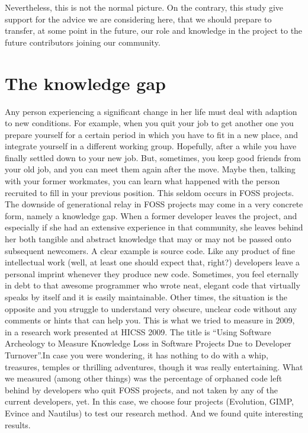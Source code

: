 Nevertheless, this is not the normal picture. On the contrary, this study give support for the advice we are considering here, that we should prepare to transfer, at some point in the future, our role and knowledge in the project to the future contributors joining our community.

\section*{The knowledge gap}

Any person experiencing a significant change in her life must deal with adaption to new conditions. For example, when you quit your job to get another one you prepare yourself for a certain period in which you have to fit in a new place, and integrate yourself in a different working group. Hopefully, after a while you have finally settled down to your new job. But, sometimes, you keep good friends from your old job, and you can meet them again after the move. Maybe then, talking with your former workmates, you can learn what happened with the person recruited to fill in your previous position. This seldom occurs in FOSS projects.
The downside of generational relay in FOSS projects may come in a very concrete form, namely a knowledge gap. When a former developer leaves the project, and especially if she had an extensive experience in that community, she leaves behind her both tangible and abstract knowledge that may or may not be passed onto subsequent newcomers.
A clear example is source code. Like any product of fine intellectual work (well, at least one should expect that, right?) developers leave a personal imprint whenever they produce new code. Sometimes, you feel eternally in debt to that awesome programmer who wrote neat, elegant code that virtually speaks by itself and it is easily maintainable. Other times, the situation is the opposite and you struggle to understand very obscure, unclear code without any comments or hints that can help you.
This is what we tried to measure in 2009, in a research work presented at HICSS 2009. The title is “Using Software Archeology to Measure Knowledge Loss in Software Projects Due to Developer Turnover”.In case you were wondering, it has nothing to do with a whip, treasures, temples or thrilling adventures, though it was really entertaining. What we measured (among other things) was the percentage of orphaned code left behind by developers who quit FOSS projects, and not taken by any of the current developers, yet. In this case, we choose four projects (Evolution, GIMP, Evince and Nautilus) to test our research method. And we found quite interesting results.
